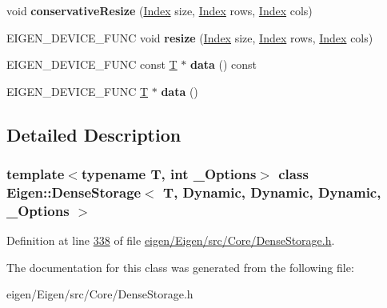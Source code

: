 \begin{DoxyCompactItemize}
void {\bfseries conservative\+Resize} (\hyperlink{namespace_eigen_a62e77e0933482dafde8fe197d9a2cfde}{Index} size, \hyperlink{namespace_eigen_a62e77e0933482dafde8fe197d9a2cfde}{Index} rows, \hyperlink{namespace_eigen_a62e77e0933482dafde8fe197d9a2cfde}{Index} cols)
\item 
\mbox{\label{class_eigen_1_1_dense_storage_3_01_t_00_01_dynamic_00_01_dynamic_00_01_dynamic_00_01___options_01_4_a2ae494f1234b4e13bea15e8c9d8fb366}} 
E\+I\+G\+E\+N\+\_\+\+D\+E\+V\+I\+C\+E\+\_\+\+F\+U\+NC void {\bfseries resize} (\hyperlink{namespace_eigen_a62e77e0933482dafde8fe197d9a2cfde}{Index} size, \hyperlink{namespace_eigen_a62e77e0933482dafde8fe197d9a2cfde}{Index} rows, \hyperlink{namespace_eigen_a62e77e0933482dafde8fe197d9a2cfde}{Index} cols)
\item 
\mbox{\label{class_eigen_1_1_dense_storage_3_01_t_00_01_dynamic_00_01_dynamic_00_01_dynamic_00_01___options_01_4_a4bc7daff65f1c17713e967d5374b9f3a}} 
E\+I\+G\+E\+N\+\_\+\+D\+E\+V\+I\+C\+E\+\_\+\+F\+U\+NC const \hyperlink{group___sparse_core___module}{T} $\ast$ {\bfseries data} () const
\item 
\mbox{\label{class_eigen_1_1_dense_storage_3_01_t_00_01_dynamic_00_01_dynamic_00_01_dynamic_00_01___options_01_4_ae86198e62fa6c6fe5ce897eacfb631ab}} 
E\+I\+G\+E\+N\+\_\+\+D\+E\+V\+I\+C\+E\+\_\+\+F\+U\+NC \hyperlink{group___sparse_core___module}{T} $\ast$ {\bfseries data} ()
\end{DoxyCompactItemize}


\subsection{Detailed Description}
\subsubsection*{template$<$typename T, int \+\_\+\+Options$>$\newline
class Eigen\+::\+Dense\+Storage$<$ T, Dynamic, Dynamic, Dynamic, \+\_\+\+Options $>$}



Definition at line \hyperlink{eigen_2_eigen_2src_2_core_2_dense_storage_8h_source_l00338}{338} of file \hyperlink{eigen_2_eigen_2src_2_core_2_dense_storage_8h_source}{eigen/\+Eigen/src/\+Core/\+Dense\+Storage.\+h}.



The documentation for this class was generated from the following file\+:\begin{DoxyCompactItemize}
\item 
eigen/\+Eigen/src/\+Core/\+Dense\+Storage.\+h\end{DoxyCompactItemize}
